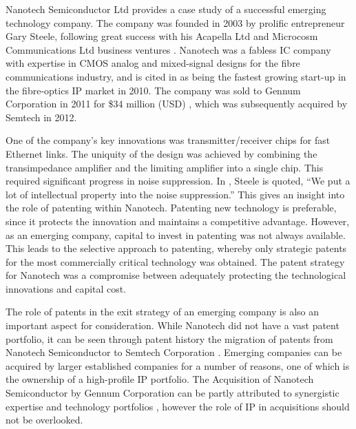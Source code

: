 {}
Nanotech Semiconductor Ltd provides a case study of a successful emerging technology company. 
The company was founded in 2003 by prolific entrepreneur Gary Steele, following great success with his Acapella Ltd and Microcosm Communications Ltd business ventures \cite{GazNesta}.
Nanotech was a fabless IC company with expertise in CMOS analog and mixed-signal designs for the fibre communications industry, and is cited in \cite{GazLightwave} as being the fastest growing start-up in the fibre-optics IP market in 2010.
The company was sold to Gennum Corporation in 2011 for \$34 million (USD) \cite{GazBloom}, which was subsequently acquired by Semtech in 2012.
 
One of the company's key innovations was transmitter/receiver chips for fast Ethernet links.
The uniquity of the design was achieved by combining the transimpedance amplifier and the limiting amplifier into a single chip.
This required significant progress in noise suppression.
In \cite{GazEW}, Steele is quoted, ``We put a lot of intellectual property into the noise suppression.''
This gives an insight into the role of patenting within Nanotech.
Patenting new technology is preferable, since it protects the innovation and maintains a competitive advantage.
However, as an emerging company, capital to invest in patenting was not always available.
This leads to the selective approach to patenting, whereby only strategic patents for the most commercially critical technology was obtained.
The patent strategy for Nanotech was a compromise between adequately protecting the technological innovations and capital cost.

The role of patents in the exit strategy of an emerging company is also an important aspect for consideration.
While Nanotech did not have a vast patent portfolio, it can be seen through patent history the migration of patents from Nanotech Semiconductor to Semtech Corporation \cite{nuttgens2013closed1} \cite{nuttgens2013closed2}.
Emerging companies can be acquired by larger established companies for a number of reasons, one of which is the ownership of a high-profile IP portfolio.
The Acquisition of Nanotech Semiconductor by Gennum Corporation can be partly attributed to synergistic expertise and technology portfolios \cite{GazBloom}, however the role of IP in acquisitions should not be overlooked.
 
